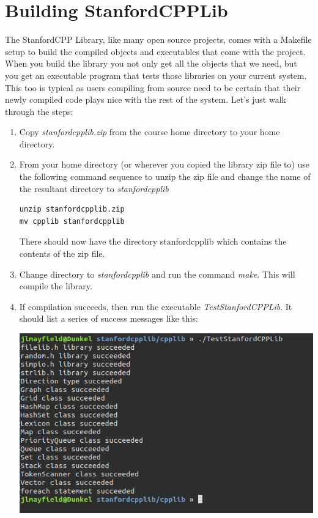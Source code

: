 \documentclass[10pt]{article}
\begin{document}
\section{ Building StanfordCPPLib }

The StanfordCPP Library, like many open source projects, comes with a Makefile setup to build the compiled objects and executables that come with the project. When you build the library you not only get all the objects that we need, but you get an executable program that tests those libraries on your current system. This too is typical as users compiling from source need to be certain that their newly compiled code plays nice with the rest of the system. Let's just walk through the steps:

\begin{enumerate}
\item Copy \textit{stanfordcpplib.zip} from the course home directory to your home directory.
\item From your home directory (or wherever you copied the library zip file to) use the following command sequence to unzip the zip file and change the name of the resultant directory to \textit{stanfordcpplib}
\begin{verbatim}
unzip stanfordcpplib.zip 
mv cpplib stanfordcpplib 
\end{verbatim}
There should now have the directory stanfordcpplib which contains the contents of the zip file. 
\item Change directory to \textit{stanfordcpplib} and run the command \textit{make}. This will compile the library. 
\item If compilation succeeds, then run the executable \textit{TestStanfordCPPLib}. It should list a series of success messages like this:
\vspace{.1in}
\begin{center}
\includegraphics[scale=.5]{scpplib-testspassed.png}
\end{center}
\vspace{.1in}


\end{enumerate}
\end{document}
